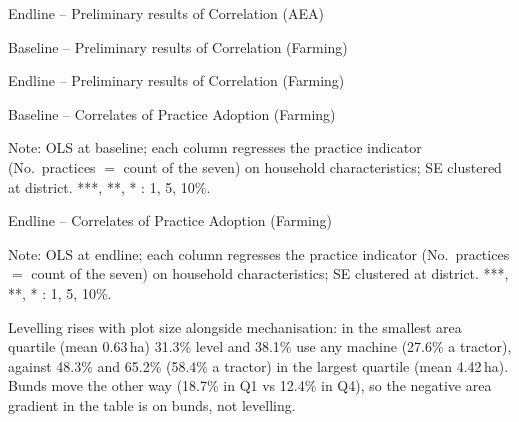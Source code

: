 \documentclass[aspectratio=169]{beamer}
\newcommand{\notefont}{\fontsize{5pt}{6pt}\selectfont}
\begin{document}
\begin{frame}{Endline -- Preliminary results of Correlation (AEA)}
	\centering
	
\end{frame}

\begin{frame}{Baseline -- Preliminary results of Correlation (Farming)}
	\centering
	
\end{frame}

\begin{frame}{Endline -- Preliminary results of Correlation (Farming)}
	\centering
	
\end{frame}

\begin{frame}{Baseline -- Correlates of Practice Adoption (Farming)}
	\centering
	\begin{minipage}{0.94\textwidth}
		\notefont
		Note: OLS at baseline; each column regresses the practice indicator (No.\ practices
		$=$ count of the seven) on household characteristics; SE clustered at district.
		***, **, * : 1, 5, 10\%.
	\end{minipage}
\end{frame}

\begin{frame}{Endline -- Correlates of Practice Adoption (Farming)}
	\centering
	\begin{minipage}{0.94\textwidth}
		\notefont
		Note: OLS at endline; each column regresses the practice indicator (No.\ practices
		$=$ count of the seven) on household characteristics; SE clustered at district.
		***, **, * : 1, 5, 10\%.
		\par Levelling rises with plot size alongside mechanisation: in the smallest area quartile
		(mean 0.63\,ha) 31.3\% level and 38.1\% use any machine (27.6\% a tractor), against 48.3\%
		and 65.2\% (58.4\% a tractor) in the largest quartile (mean 4.42\,ha). Bunds move the other
		way (18.7\% in Q1 vs 12.4\% in Q4), so the negative area gradient in the table is on bunds,
		not levelling.
	\end{minipage}
\end{frame}
\end{document}
